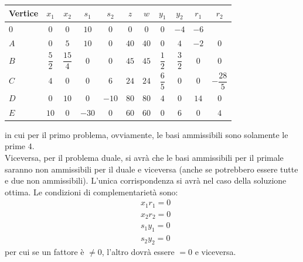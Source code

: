 \documentclass[a4paper]{extarticle}
\renewcommand\arraystretch{}
\begin{document}
\vspace{1em}
\noindent
\begin{table}[H]
    \setlength{\tabcolsep}{8pt}
    \renewcommand{\arraystretch}{1.5}
    \noindent
    \centering
    \begin{tabular}{l|ccccc|ccccc|}
        Vertice & $x_1$ & $x_2$ & $s_1$ & $s_2$ & $z$ & $w$ & $y_1$ & $y_2$ & $r_1$ & $r_2$\\
        \hline
        $0$ & $0$ & $0$ & $10$ & $0$ & $0$ & $0$ & $0$ & $-4$ & $-6$\\
        $A$ & $0$ & $5$ & $10$ & $0$ & $40$ & $40$ & $0$ & $4$ & $-2$ & $0$\\
        $B$ & $\dfrac{5}{2}$ & $\dfrac{15}{4}$ & $0$ & $0$ & $45$ & $45$ & $\dfrac{1}{2}$ & $\dfrac{3}{2}$ & $0$ & $0$\\
        $C$ & $4$ & $0$ & $0$ & $6$ & $24$ & $24$ & $\dfrac{6}{5}$ &$0$ & $0$ & $-\dfrac{28}{5}$\\
        $D$ & $0$ & $10$ & $0$ & $-10$ & $80$ & $80$ & $4$ & $0$ & $14$ & $0$\\
        $E$ & $10$ & $0$ & $-30$ & $0$ & $60$ & $60$ & $0$ & $6$ & $0$ & $4$\\
    \end{tabular}
\end{table}
in cui per il primo problema, ovviamente, le basi ammissibili sono solamente le prime $4$.\\
Viceversa, per il problema duale, si avrà che le basi ammissibili per il primale saranno non ammissibili per il duale e viceversa (anche se potrebbero essere tutte e due non ammissibili). L'unica corrispondenza si avrà nel caso della soluzione ottima. Le condizioni di complementarietà sono:
\begin{align*}
    &x_1 r_1 = 0\\
    &x_2 r_2 = 0\\
    &s_1 y_1 = 0\\
    &s_2 y_2 = 0
\end{align*}
per cui se un fattore è $\neq 0$, l'altro dovrà essere $=0$ e viceversa.
\end{document}
